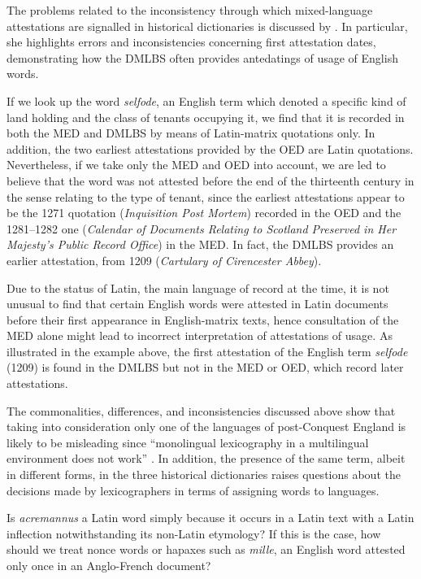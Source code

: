 \documentclass[output=paper,colorlinks,citecolor=brown,arabicfont,chinesefont]{langscibook}
\begin{document}
The problems related to the inconsistency through which mixed-language attestations are signalled in historical dictionaries is discussed by \citet{Wright2011,Wright2013a}. In particular, she highlights errors and inconsistencies concerning first attestation dates, demonstrating how the DMLBS often provides antedatings of usage of English words. 

If we look up the word \emph{selfode}, an English term which denoted a specific kind of land holding and the class of tenants occupying it, we find that it is recorded in both the MED and DMLBS by means of Latin-matrix quotations only. In addition, the two earliest attestations provided by the OED are Latin quotations. Nevertheless, if we take only the MED and OED into account, we are led to believe that the word was not attested before the end of the thirteenth century in the sense relating to the type of tenant, since the earliest attestations appear to be the 1271 quotation (\emph{Inquisition Post Mortem}) recorded in the OED and the 1281--1282 one (\emph{Calendar of Documents Relating to Scotland Preserved in Her Majesty's Public Record Office}) in the MED. In fact, the DMLBS provides an earlier attestation, from 1209 (\emph{Cartulary of Cirencester Abbey}).

Due to the status of Latin, the main language of record at the time, it is not unusual to find that certain English words were attested in Latin documents before their first appearance in English-matrix texts, hence consultation of the MED alone might lead to incorrect interpretation of attestations of usage. As illustrated in the example above, the first attestation of the English term \emph{selfode} (1209) is found in the DMLBS but not in the MED or OED, which record later attestations.

The commonalities, differences, and inconsistencies discussed above show that taking into consideration only one of the languages of post-Conquest England is likely to be misleading since “monolingual lexicography in a multilingual environment does not work” \citep[4]{Trotter2000b}. In addition, the presence of the same term, albeit in different forms, in the three historical dictionaries raises questions about the decisions made by lexicographers in terms of assigning words to languages.

Is \emph{acremannus} a Latin word simply because it occurs in a Latin text with a Latin inflection notwithstanding its non-Latin etymology? If this is the case, how should we treat nonce words or hapaxes such as \emph{mille}, an English word attested only once in an Anglo-French document? 
\end{document}
